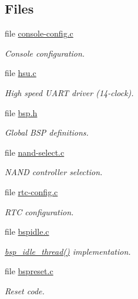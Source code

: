 \subsection*{Files}
\begin{DoxyCompactItemize}
\item 
file \mbox{\hyperlink{arm_2lpc32xx_2console_2console-config_8c}{console-\/config.\+c}}
\begin{DoxyCompactList}\small\item\em Console configuration. \end{DoxyCompactList}\item 
file \mbox{\hyperlink{hsu_8c}{hsu.\+c}}
\begin{DoxyCompactList}\small\item\em High speed U\+A\+RT driver (14-\/clock). \end{DoxyCompactList}\item 
file \mbox{\hyperlink{bsps_2arm_2lpc32xx_2include_2bsp_8h}{bsp.\+h}}
\begin{DoxyCompactList}\small\item\em Global B\+SP definitions. \end{DoxyCompactList}\item 
file \mbox{\hyperlink{nand-select_8c}{nand-\/select.\+c}}
\begin{DoxyCompactList}\small\item\em N\+A\+ND controller selection. \end{DoxyCompactList}\item 
file \mbox{\hyperlink{arm_2lpc32xx_2rtc_2rtc-config_8c}{rtc-\/config.\+c}}
\begin{DoxyCompactList}\small\item\em R\+TC configuration. \end{DoxyCompactList}\item 
file \mbox{\hyperlink{arm_2lpc32xx_2start_2bspidle_8c}{bspidle.\+c}}
\begin{DoxyCompactList}\small\item\em \mbox{\hyperlink{group__RTEMSBSPsARMLPC176X_ga301be7085b80c41a9c5887247003c662}{bsp\+\_\+idle\+\_\+thread()}} implementation. \end{DoxyCompactList}\item 
file \mbox{\hyperlink{arm_2lpc32xx_2start_2bspreset_8c}{bspreset.\+c}}
\begin{DoxyCompactList}\small\item\em Reset code. \end{DoxyCompactList}\item 

\end{DoxyCompactItemize}
